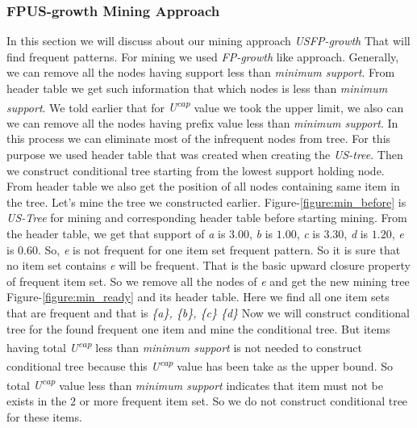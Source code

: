 \documentclass[conference]{IEEEtran}
\begin{document}
\subsubsection{FPUS-growth Mining Approach}
In this section we will discuss about our mining approach \emph{USFP-growth} That will find frequent patterns. For mining we used \emph{FP-growth} like approach. Generally, we can remove all the nodes having support less than \emph{minimum support}. From header table we get such information that which nodes is less than \emph{minimum support}. We told earlier that for \emph{U\textsuperscript{cap}} value we took the upper limit, we also can we can remove all the nodes having prefix value less than \emph{minimum support}. In this process we can eliminate most of the infrequent nodes from tree. For this purpose we used header table that was created when creating the \emph{US-tree}. Then we construct conditional tree starting from the lowest support holding node. From header table we also get the position of all nodes containing same item in the tree. 
    Let’s mine the tree we constructed earlier. Figure-\ref{figure:min_before} is \emph{US-Tree} for mining and corresponding header table before starting mining. From the header table, we get that support of \emph{a} is $3.00$, \emph{b} is $1.00$, \emph{c} is $3.30$, \emph{d} is $1.20$, \emph{e} is $0.60$. So, \emph{e} is not frequent for one item set frequent pattern. So it is sure that no item set contains \emph{e} will be frequent. That is the basic upward closure property of frequent item set. So we remove all the nodes of \emph{e} and get the new mining tree Figure-\ref{figure:min_ready} and its header table. Here we find all one item sets that are frequent and that is \emph{\{a\}, \{b\}, \{c\} \{d\}} Now we will construct conditional tree for the found frequent one item and mine the conditional tree. But items having total \emph{U\textsuperscript{cap}} less than \emph{minimum support} is not needed to construct conditional tree because this \emph{U\textsuperscript{cap}} value has been take as the upper bound. So total \emph{U\textsuperscript{cap}} value less than \emph{minimum support} indicates that item must not be exists in the $2$ or more frequent item set. So we do not construct conditional tree for these items.
\end{document}
